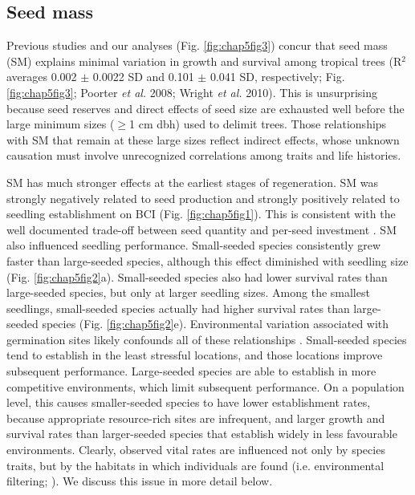 \documentclass[b5paper,justified]{tufte-book} %
\begin{document}
\begin{fullwidth}
\subsection{Seed mass}
Previous studies and our analyses (Fig. \ref{fig:chap5fig3}) concur that seed mass (SM) explains minimal variation in growth and survival among tropical trees (R$^2$ averages 0.002 $\pm$ 0.0022 SD and 0.101 $\pm$ 0.041 SD, respectively; Fig. \ref{fig:chap5fig3}; Poorter \emph{et al.} 2008; Wright \emph{et al.} 2010). This is unsurprising because seed reserves and direct effects of seed size are exhausted well before the large minimum sizes ($\geq$1 cm dbh) used to delimit trees. Those relationships with SM that remain at these large sizes reflect indirect effects, whose unknown causation must involve unrecognized correlations among traits and life histories.

SM has much stronger effects at the earliest stages of regeneration. SM was strongly negatively related to seed
production and strongly positively related to seedling establishment on BCI (Fig. \ref{fig:chap5fig1}). This is consistent with the well documented trade-off between seed quantity and per-seed investment \citep{Henery2001, Westoby2002, Muller-Landau2010}. SM also influenced seedling performance. Small-seeded species consistently grew faster than large-seeded species, although this effect diminished with seedling size (Fig. \ref{fig:chap5fig2}a). Small-seeded species also had lower survival rates than large-seeded species, but only at larger seedling
sizes. Among the smallest seedlings, small-seeded species actually had higher survival rates than large-seeded species (Fig. \ref{fig:chap5fig2}e). Environmental variation associated with germination sites likely confounds all of these relationships \citep{Lichstein2010,Muller-Landau2010}. Small-seeded species tend to establish in the least stressful locations, and those locations improve subsequent performance. Large-seeded species are able to establish in more competitive environments, which limit subsequent performance. On a population level, this causes smaller-seeded species to have lower establishment rates, because appropriate resource-rich sites are infrequent, and larger growth and survival rates than larger-seeded species that establish widely in less favourable environments. Clearly, observed vital rates are influenced not only by species traits, but by the habitats in which individuals are found (i.e. environmental filtering; \citealt{Lasky2013}). We discuss this issue in more detail below.



\end{fullwidth}
\end{document}
